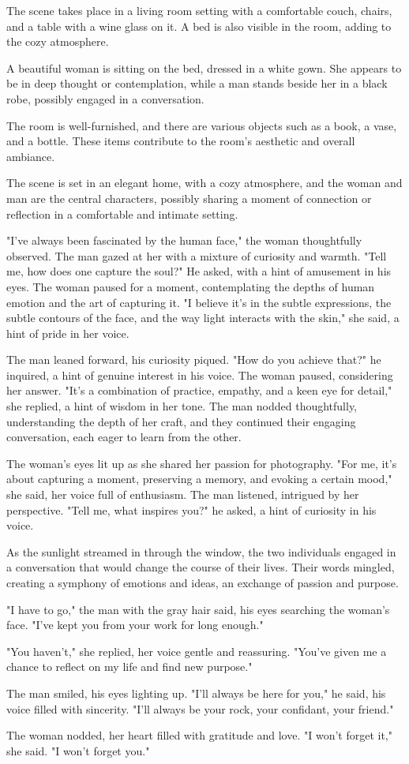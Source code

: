 \documentclass[smalldemyvopaper,11pt,twoside,onecolumn,openright,extrafontsizes]{memoir}
\begin{document}
The scene takes place in a living room setting with a comfortable couch, chairs, and a table with a wine glass on it. A bed is also visible in the room, adding to the cozy atmosphere.\par
A beautiful woman is sitting on the bed, dressed in a white gown. She appears to be in deep thought or contemplation, while a man stands beside her in a black robe, possibly engaged in a conversation.\par
The room is well-furnished, and there are various objects such as a book, a vase, and a bottle. These items contribute to the room's aesthetic and overall ambiance.\par
The scene is set in an elegant home, with a cozy atmosphere, and the woman and man are the central characters, possibly sharing a moment of connection or reflection in a comfortable and intimate setting.\par
"I've always been fascinated by the human face," the woman thoughtfully observed. The man gazed at her with a mixture of curiosity and warmth. "Tell me, how does one capture the soul?" He asked, with a hint of amusement in his eyes. The woman paused for a moment, contemplating the depths of human emotion and the art of capturing it. "I believe it's in the subtle expressions, the subtle contours of the face, and the way light interacts with the skin," she said, a hint of pride in her voice.\par
The man leaned forward, his curiosity piqued. "How do you achieve that?" he inquired, a hint of genuine interest in his voice. The woman paused, considering her answer. "It's a combination of practice, empathy, and a keen eye for detail," she replied, a hint of wisdom in her tone. The man nodded thoughtfully, understanding the depth of her craft, and they continued their engaging conversation, each eager to learn from the other.\par
The woman's eyes lit up as she shared her passion for photography. "For me, it's about capturing a moment, preserving a memory, and evoking a certain mood," she said, her voice full of enthusiasm. The man listened, intrigued by her perspective. "Tell me, what inspires you?" he asked, a hint of curiosity in his voice.\par
As the sunlight streamed in through the window, the two individuals engaged in a conversation that would change the course of their lives. Their words mingled, creating a symphony of emotions and ideas, an exchange of passion and purpose.\par
"I have to go," the man with the gray hair said, his eyes searching the woman's face. "I've kept you from your work for long enough."\par
"You haven't," she replied, her voice gentle and reassuring. "You've given me a chance to reflect on my life and find new purpose."\par
The man smiled, his eyes lighting up. "I'll always be here for you," he said, his voice filled with sincerity. "I'll always be your rock, your confidant, your friend."\par
The woman nodded, her heart filled with gratitude and love. "I won't forget it," she said. "I won't forget you."\par
\end{document}
